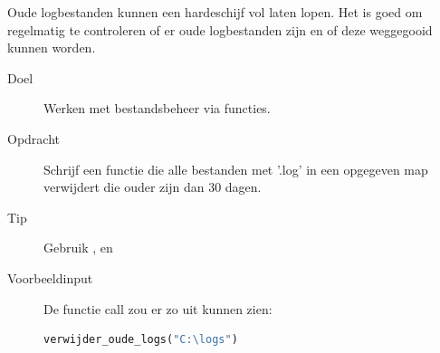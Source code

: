 Oude logbestanden kunnen een hardeschijf vol laten lopen. Het is goed om regelmatig te controleren of er oude logbestanden zijn en of deze weggegooid kunnen worden.
\begin{description}
\item[Doel] Werken met bestandsbeheer via functies.
\item[Opdracht] Schrijf een functie  die alle bestanden met '.log' in een opgegeven map verwijdert die ouder zijn dan 30 dagen.
\item[Tip] Gebruik ,  en 
\item[Voorbeeldinput] De functie call zou er zo uit kunnen zien:

\begin{lstlisting}[language=python]
verwijder_oude_logs("C:\logs")
\end{lstlisting}

\end{description}

